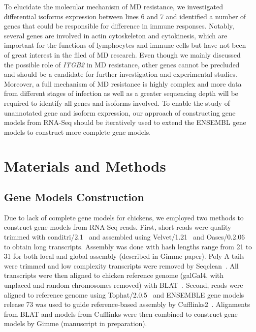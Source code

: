 \documentclass[10pt]{article}
\begin{document}
To elucidate the molecular mechanism of MD resistance, we investigated
differential isoforms expression between lines 6 and 7 and identified a number
of genes that could be responsible for difference in immune responses. Notably,
several genes are involved in actin cytoskeleton and cytokinesis, which are
important for the functions of lymphocytes and immune cells but have not been of
great interest in the filed of MD research.  Even though we mainly discussed the
possible role of {\em ITGB2} in MD resistance, other genes cannot be precluded
and should be a candidate for further investigation and experimental studies.
Moreover, a full mechanism of MD resistance is highly complex and more data from
different stages of infection as well as a greater sequencing depth will be
required to identify all genes and isoforms involved.  To enable the study of
unannotated gene and isoform expression, our approach of constructing gene
models from RNA-Seq should be iteratively used to extend the ENSEMBL gene models
to construct more complete gene models.


\section*{Materials and Methods}
\subsection{Gene Models Construction}

Due to lack of complete gene models for chickens, we employed two methods to
construct gene models from RNA-Seq reads.  First, short reads were quality
trimmed with conditri/2.1~\cite{} and assembled using Velvet/1.21~\cite{} and
Oases/0.2.06~\cite{} to obtain long transcripts.  Assembly was done with hash
lengths range from 21 to 31 for both local and global assembly (described in
Gimme paper).  Poly-A tails were trimmed and low complexity transcripts were
removed by Seqclean~\cite{}.  All transcripts were then aligned to chicken
reference genome (galGal4, with unplaced and random chromosomes removed) with
BLAT~\cite{}.  Second, reads were aligned to reference genome using
Tophat/2.0.5~\cite{} and ENSEMBLE gene models release 73 was used to guide
reference-based assembly by Cufflinks2~\cite{}.  Alignments from BLAT and models
from Cufflinks were then combined to construct gene models by Gimme (manuscript
in preparation).
\end{document}
